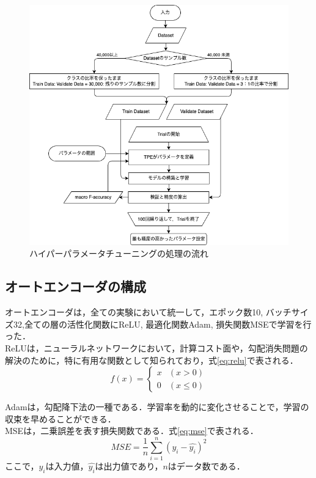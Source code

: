 \begin{figure}
    \centering
    \includegraphics[width=15cm]{figures/optuna.png}
        \caption{ハイパーパラメータチューニングの処理の流れ}
        \label{fig:hyperparameter-tuning}
\end{figure}



\subsection{オートエンコーダの構成}
オートエンコーダは，全ての実験において統一して，エポック数10, バッチサイズ32,全ての層の活性化関数にReLU, 最適化関数Adam, 損失関数MSEで学習を行った．\\
ReLUは，ニューラルネットワークにおいて，計算コスト面や，勾配消失問題の解決のために，特に有用な関数として知られており，式\ref{eq:relu}で表される．
\begin{equation}
    \label{eq:relu}
    f(x) = \begin{cases}
        x & (x > 0) \\
        0 & (x \leq 0)
    \end{cases}
\end{equation}

Adamは，勾配降下法の一種である．学習率を動的に変化させることで，学習の収束を早めることができる．\\
MSEは，二乗誤差を表す損失関数である．式\ref{eq:mse}で表される．
\begin{equation}
    \label{eq:mse}
    MSE = \frac{1}{n}\sum_{i=1}^{n}(y_i - \hat{y_i})^2
\end{equation}
ここで，$y_i$は入力値，$\hat{y_i}$は出力値であり，$n$はデータ数である．\\

